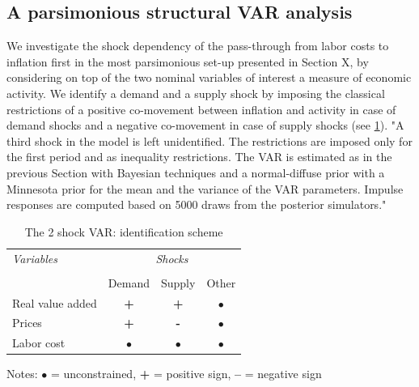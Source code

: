\documentclass[11pt]{article}
\begin{document}



\subsection{A parsimonious structural VAR analysis}

We investigate the shock dependency of the pass-through from labor costs to inflation first in the most parsimonious set-up presented in Section X, by considering on top of the two nominal variables of interest a measure of economic activity. We identify a demand and a supply shock by imposing the classical restrictions of a positive co-movement between inflation and activity in case of demand shocks and a negative co-movement in case of supply shocks (see \ref{tab: identification1}). "A third shock in the model is left unidentified. The restrictions are imposed only for the first period and as inequality restrictions. The VAR is estimated as in the previous Section with Bayesian techniques and a normal-diffuse prior with a Minnesota prior for the mean and the variance of the VAR parameters. Impulse responses are computed based on 5000 draws from the posterior simulators." 

\begin{table}[!h]
\begin{center}
\caption{The 2 shock VAR: identification scheme}
\vskip 0.5cm
\label{tab: identification1}
\begin{tabular}{lccc}
\toprule
\textit{Variables} & \multicolumn{3}{c}{\textit{Shocks}} \\ \\[-1ex]
& Demand   & Supply  & Other \\
Real value added & \textbf{+} & \textbf{+} & $\bullet$ \\
Prices & \textbf{+} & \textbf{-} & $\bullet$ \\
Labor cost & $\bullet$     & $\bullet$     & $\bullet$ \\
\end{tabular}
\end{center}
\par
{\small \begin{center}Notes: $\bullet$ = unconstrained, \textbf{+} = positive sign,
\textbf{--} = negative sign \end{center}}
\end{table}
\end{document}
